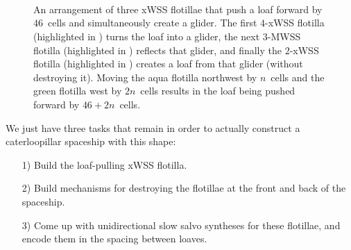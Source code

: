 \clearpage


\begin{figure}[!htb]
	\centering
	 \\[1em]
	
	 \\[1em]
	
	 \\[1em]
	
	
	\caption{An arrangement of three xWSS flotillae that push a loaf forward by $46$~cells and simultaneously create a glider. The first $4$-xWSS flotilla (highlighted in ) turns the loaf into a glider, the next $3$-MWSS flotilla (highlighted in ) reflects that glider, and finally the $2$-xWSS flotilla (highlighted in ) creates a loaf from that glider (without destroying it). Moving the aqua flotilla northwest by $n$~cells and the green flotilla west by $2n$~cells results in the loaf being pushed forward by $46 + 2n$~cells.}\label{fig:caterloopillar_loaf_pusher}
\end{figure}

We just have three tasks that remain in order to actually construct a caterloopillar spaceship with this shape:\smallskip

\begin{itemize}
	\item[1)] Build the loaf-pulling xWSS flotilla.\smallskip
	
	\item[2)] Build mechanisms for destroying the flotillae at the front and back of the spaceship.\smallskip
	
	\item[3)] Come up with unidirectional slow salvo syntheses for these flotillae, and encode them in the spacing between loaves.\smallskip
\end{itemize}

